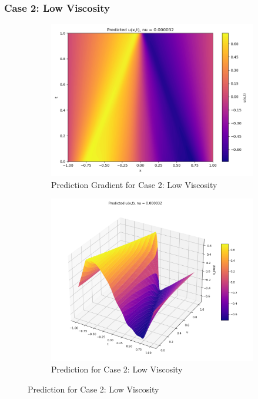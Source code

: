 \documentclass[11pt]{article}
\begin{document}
\subsubsection{Case 2: Low Viscosity}
\begin{figure}[h!]
    \centering
    \begin{subfigure}[b]{0.48\textwidth}
        \includegraphics[width=\textwidth]{1D_PredGrad_NU2.png}
        \caption{Prediction Gradient for Case 2: Low Viscosity}
        \label{fig:PredGrad_NU2}
    \end{subfigure}
    \hfill
    \begin{subfigure}[b]{0.48\textwidth}
        \includegraphics[width=\textwidth]{1D_Pred_NU2.png}
        \caption{Prediction for Case 2: Low Viscosity}
        \label{fig:Pred_NU2}
    \end{subfigure}
    \caption{Prediction for Case 2: Low Viscosity}
    \label{fig:PredTotal_NU2}
\end{figure}
\end{document}
